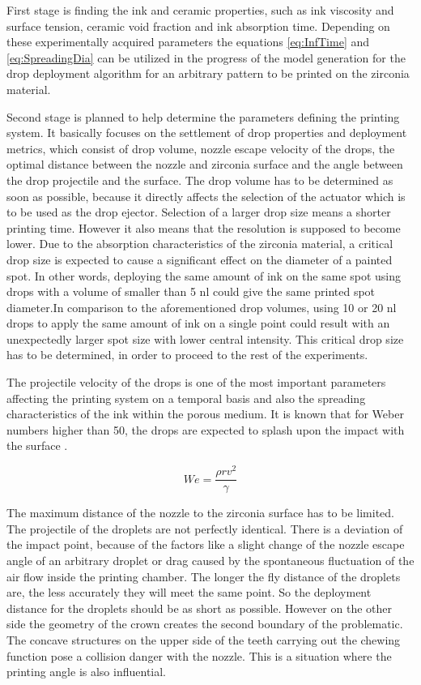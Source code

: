 \bigskip
\space
\bigskip
\space
\bigskip
 First stage is finding the ink and ceramic properties, such as ink viscosity and surface tension, ceramic void fraction and ink absorption time. Depending on these experimentally acquired parameters the equations \ref{eq:InfTime} and \ref{eq:SpreadingDia} can be utilized  in the progress of the model generation for the drop deployment algorithm for an arbitrary pattern to be printed on the zirconia material. 
 
 Second stage is planned to help determine the parameters defining the printing system. It basically focuses on the settlement of drop properties and deployment metrics, which consist of drop volume, nozzle escape velocity of the drops, the optimal distance between the nozzle and zirconia surface and the angle between the drop projectile and the surface. The drop volume has to be determined as soon as possible, because it directly affects the selection of the actuator which is to be used as the drop ejector. Selection of a larger drop size means a shorter printing time. However it also means that the resolution is supposed to become lower. Due to the absorption characteristics of the zirconia material, a critical drop size is expected to cause a significant effect on the diameter of a painted spot. In other words, deploying the same amount of ink on the same spot using drops with a volume of smaller than 5 nl could give the same printed spot diameter.In comparison to the aforementioned drop volumes, using  10 or 20 nl drops to apply the same amount of ink on a single point could result with an unexpectedly larger spot size with lower central intensity. This critical drop size has to be determined, in order to proceed to the rest of the experiments.  
 
 The projectile velocity of the drops is one of the most important parameters affecting the printing system on a temporal basis and also the spreading characteristics of the ink within the porous medium. It is known that for Weber numbers higher than 50, the drops are expected to splash upon the impact with the surface \citep{clarke2002spreading}.
 
 \bigskip
 
 \begin{equation}\label{eq:weber}
 We=\frac{\rho rv^2}{\gamma}
 \end{equation}
 
 \bigskip
 
 The maximum distance of the nozzle to the zirconia surface has to be limited. The projectile of the droplets are not perfectly identical. There is a deviation of the impact point, because of the factors like a slight change of the nozzle escape angle of an arbitrary droplet or drag caused by the spontaneous fluctuation of the air flow inside the printing chamber. The longer the fly distance of the droplets are, the less accurately they will meet the same point. So the deployment distance for the droplets should be as short as possible. However on the other side the geometry of the crown creates the second boundary of the problematic. The concave structures on the upper side of the teeth carrying out the chewing function pose a collision danger with the nozzle. This is a situation where the printing angle is also influential. 
 
